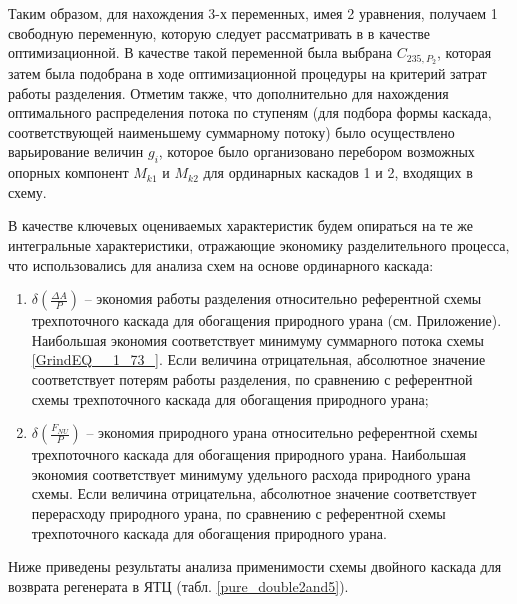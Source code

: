 Таким образом, для нахождения 3-х переменных, имея 2 уравнения, получаем 1 свободную переменную, которую следует рассматривать в в качестве оптимизационной. В качестве такой переменной была выбрана $C_{235, P_2}$, которая затем была подобрана в ходе оптимизационной процедуры на критерий затрат работы разделения. Отметим также, что дополнительно для нахождения оптимального распределения потока по ступеням (для подбора формы каскада, соответствующей наименьшему суммарному потоку) было осуществлено варьирование величин $g_{i}$, которое было организовано перебором возможных опорных компонент $M_{k1}$ и $M_{k2}$ для ординарных каскадов 1 и 2, входящих в схему.


В качестве ключевых оцениваемых характеристик будем опираться на те же интегральные характеристики, отражающие экономику разделительного процесса, что использовались для анализа схем на основе ординарного каскада:
\begin{enumerate}
    \item $\delta(\frac{\Delta A}{P})$ -- экономия работы разделения относительно референтной схемы трехпоточного каскада для обогащения природного урана (см. Приложение). Наибольшая экономия соответствует минимуму суммарного потока схемы \ref{GrindEQ__1_73_}. Если величина отрицательная, абсолютное значение соответствует потерям работы разделения, по сравнению с референтной схемы трехпоточного каскада для обогащения природного урана;
    \item $\delta(\frac{F_{NU}}{P})$ -- экономия природного урана относительно референтной схемы трехпоточного каскада для обогащения природного урана.  Наибольшая экономия соответствует минимуму удельного расхода природного урана схемы. Если величина отрицательна, абсолютное значение соответствует перерасходу природного урана, по сравнению с референтной схемы трехпоточного каскада для обогащения природного урана.
\end{enumerate}

Ниже приведены результаты анализа применимости схемы двойного каскада для возврата регенерата в ЯТЦ (табл. \ref{pure_double2and5}). 

